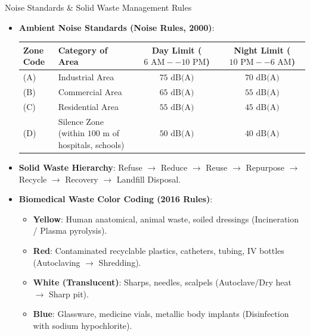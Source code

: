 \begin{lawbox}{Noise Standards \& Solid Waste Management Rules}
\begin{itemize}[leftmargin=1.2em]
    \item \textbf{Ambient Noise Standards (Noise Rules, 2000)}:
    \begin{center}
    \begin{tabular}{llcc}
    \toprule
    \textbf{Zone Code} & \textbf{Category of Area} & \textbf{Day Limit ($6\text{ AM}--10\text{ PM}$)} & \textbf{Night Limit ($10\text{ PM}--6\text{ AM}$)} \\
    \midrule
    (A) & Industrial Area & $75\text{ dB(A)}$ & $70\text{ dB(A)}$ \\
    (B) & Commercial Area & $65\text{ dB(A)}$ & $55\text{ dB(A)}$ \\
    (C) & Residential Area & $55\text{ dB(A)}$ & $45\text{ dB(A)}$ \\
    (D) & Silence Zone (within $100\text{ m}$ of hospitals, schools) & $50\text{ dB(A)}$ & $40\text{ dB(A)}$ \\
    \bottomrule
    \end{tabular}
    \end{center}
    \item \textbf{Solid Waste Hierarchy}: Refuse $\to$ Reduce $\to$ Reuse $\to$ Repurpose $\to$ Recycle $\to$ Recovery $\to$ Landfill Disposal.
    \item \textbf{Biomedical Waste Color Coding (2016 Rules)}:
    \begin{itemize}
        \item \textbf{Yellow}: Human anatomical, animal waste, soiled dressings (Incineration / Plasma pyrolysis).
        \item \textbf{Red}: Contaminated recyclable plastics, catheters, tubing, IV bottles (Autoclaving $\to$ Shredding).
        \item \textbf{White (Translucent)}: Sharps, needles, scalpels (Autoclave/Dry heat $\to$ Sharp pit).
        \item \textbf{Blue}: Glassware, medicine vials, metallic body implants (Disinfection with sodium hypochlorite).
    \end{itemize}
\end{itemize}
\end{lawbox}
